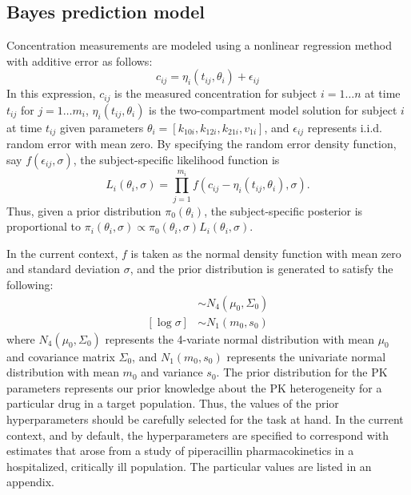 \documentclass{article}\usepackage[]{graphicx}\usepackage[]{color}
\begin{document}

\subsection{Bayes prediction model} %
Concentration measurements are modeled using a nonlinear regression method with additive error as follows:
\begin{displaymath}
c_{ij} = \eta_i(t_{ij}, \theta_i) + \epsilon_{ij}
\end{displaymath}
\noindent In this expression, $c_{ij}$ is the measured concentration for subject $i = 1 \ldots n$ at time $t_{ij}$ for $j = 1 \ldots m_i$, $\eta_i(t_{ij}, \theta_i)$ is the two-compartment model solution for subject $i$ at time $t_{ij}$ given parameters $\theta_i = [k_{10i}, k_{12i}, k_{21i}, v_{1i}]$, and $\epsilon_{ij}$ represents i.i.d. random error with mean zero. By specifying the random error density function, say $f(\epsilon_{ij}, \sigma)$, the subject-specific likelihood function is
\begin{displaymath}
L_i(\theta_i, \sigma) = \prod_{j=1}^{m_i} f(c_{ij} - \eta_i(t_{ij}, \theta_i), \sigma).
\end{displaymath}
\noindent Thus, given a prior distribution $\pi_0(\theta_i)$, the subject-specific posterior is proportional to $\pi_i(\theta_i, \sigma) \propto \pi_0(\theta_i,\sigma)L_i(\theta_i,\sigma)$.

In the current context, $f$ is taken as the normal density function with mean zero and standard deviation $\sigma$, and the prior distribution is generated to satisfy the following:
\begin{align}
[\log \theta_i] &\sim N_4(\mu_0, \Sigma_0) \\
[\log \sigma] &\sim N_1(m_0, s_0)
\end{align}
\noindent where $N_4(\mu_0, \Sigma_0)$ represents the 4-variate normal distribution with mean $\mu_0$ and covariance matrix $\Sigma_0$, and $N_1(m_0, s_0)$ represents the univariate normal distribution with mean $m_0$ and variance $s_0$. The prior distribution for the PK parameters represents our prior knowledge about the PK heterogeneity for a particular drug in a target population. Thus, the values of the prior hyperparameters should be carefully selected for the task at hand. In the current context, and by default, the hyperparameters are specified to correspond with estimates that arose from a study of piperacillin pharmacokinetics in a hospitalized, critically ill population. The particular values are listed in an appendix.
\end{document}
